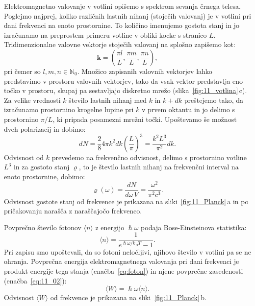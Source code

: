 Elektromagnetno valovanje v votlini opišemo s spektrom sevanja
črnega telesa. Poglejmo najprej, koliko različnih lastnih nihanj
(stoječih valovanj) je v votlini pri dani frekvenci na enoto prostornine.
To količino imenujemo gostota stanj in jo izračunamo na preprostem primeru
votline v obliki kocke s stranico $L$.
Tridimenzionalne valovne vektorje stoječih valovanj na splošno zapišemo kot:
\begin{equation}
\mathbf{k} = \left(\frac{\pi l}{L}, \frac{\pi m}{L}, \frac{\pi n}{L}\right)\!\!,
\label{eq:11_04}
\end{equation}
pri čemer so $l,m,n \in \mathbb{N}_0$. Množico zapisanih valovnih vektorjev
lahko predstavimo v prostoru valovnih vektorjev, tako da
vsak vektor predstavlja eno točko v prostoru, skupaj 
pa sestavljajo diskretno mrežo (slika~\ref{fig:11_votlina}\,c). 
Za velike vrednosti $k$ število lastnih nihanj 
med $k$ in $k+dk$ preštejemo tako, da izračunamo prostornino krogelne 
lupine pri $k$ v prvem oktantu in jo delimo s prostornino $\pi/L$, 
ki pripada posamezni  mrežni točki. Upoštevamo še možnost dveh polarizacij 
in dobimo:
\begin{equation}
dN = \frac{2}{8}4\pi k^2 dk \left(\frac{L}{\pi}\right)^3 = \frac{k^2 L^3}{\pi^2}dk.
\label{eq:11_05}
\end{equation}
Odvisnost od $k$ prevedemo na frekvenčno odvisnost, delimo s prostornino votline $L^3$
in za gostoto stanj $\varrho$, to je število lastnih nihanj na frekvenčni interval
na enoto prostornine, dobimo:
\begin{equation}
\varrho (\omega) = \frac{dN}{d\omega\, V} = \frac{\omega^2}{\pi^2c^3}.
\label{eq:11_06}
\end{equation}
Odvisnost gostote stanj od frekvence je prikazana na sliki~\ref{fig:11_Planck}\,a in po 
pričakovanju narašča z naraščajočo frekvenco. 

Povprečno število fotonov $\langle n \rangle$ 
z energijo $\hslash \omega$ podaja 
Bose-Einsteinova statistika:
\begin{equation}
\langle n \rangle = \frac{1}{e^{\hslash \omega/k_B T}-1}.
\label{eq:11_02}
\end{equation}
Pri zapisu smo upoštevali, da so fotoni neločljivi, njihovo število v votlini
pa se ne ohranja. Povprečna energija elektromagnetnega valovanja pri dani 
frekvenci je produkt energije tega stanja (enačba~\ref{eq:foton}) in njene povprečne 
zasedenosti (enačba~\ref{eq:11_02}):
\begin{equation}
\langle W \rangle = \hslash \omega \langle n \rangle.
\label{eq:11_03}
\end{equation}
Odvisnost $\langle W \rangle$ od frekvence je prikazana na sliki~\ref{fig:11_Planck}\,b.

